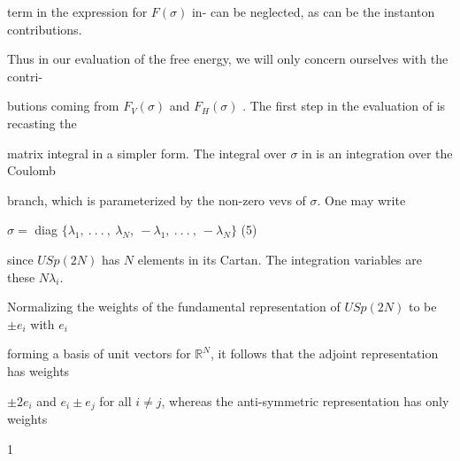 \documentclass[a4paper,12pt]{article}
\begin{document}
term in the expression for $F(\sigma)$ in- can be neglected, as can be the instanton contributions.

Thus in our evaluation of the free energy, we will only concern ourselves with the contri-

butions coming from $F_{V}(\sigma)$ and $F_{H}(\sigma)$ . The first step in the evaluation of is recasting the

matrix integral in a simpler form. The integral over $\sigma$ in is an integration over the Coulomb

branch, which is parameterized by the non-zero vevs of $\sigma$. One may write
\begin{center}
$\sigma=$ diag $\{\lambda_{1},\ .\ .\ .\ ,\ \lambda_{N},\ -\lambda_{1},\ .\ .\ .\ ,\ -\lambda_{N}\}$   (5)
\end{center}
since $USp(2N)$ has $N$ elements in its Cartan. The integration variables are these $N \lambda_{i}.$

Normalizing the weights of the fundamental representation of $USp(2N)$ to be $\pm e_{i}$ with $e_{i}$

forming a basis of unit vectors for $\mathbb{R}^{N}$, it follows that the adjoint representation has weights

$\pm 2e_{i}$ and $e_{i}\pm e_{j}$ for all $i\neq j$, whereas the anti-symmetric representation has only weights

1
\end{document}
